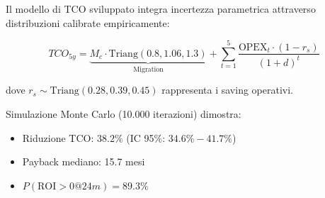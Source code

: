 Il modello di TCO sviluppato integra incertezza parametrica attraverso 
distribuzioni calibrate empiricamente:

\begin{equation}
TCO_{5y} = \underbrace{M_c \cdot \text{Triang}(0.8, 1.06, 1.3)}_{\text{Migration}} + 
           \sum_{t=1}^{5} \frac{\text{OPEX}_t \cdot (1-r_s)}{(1+d)^t}
\end{equation}

dove $r_s \sim \text{Triang}(0.28, 0.39, 0.45)$ rappresenta i saving operativi.

\begin{tcolorbox}[colback=yellow!10!white,colframe=orange!75!black,title=Risultato Chiave]
Simulazione Monte Carlo (10.000 iterazioni) dimostra:
\begin{itemize}
\item Riduzione TCO: $38.2\%$ (IC 95\%: $34.6\%-41.7\%$)
\item Payback mediano: 15.7 mesi
\item $P(\text{ROI}>0 @ 24m) = 89.3\%$
\end{itemize}
\end{tcolorbox}

